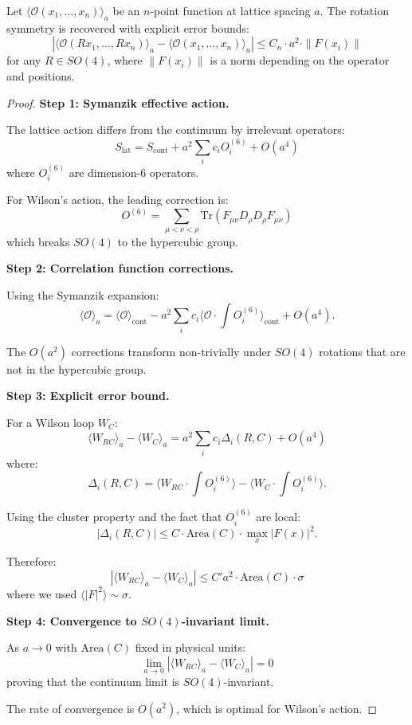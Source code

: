 \begin{theorem}
\label{thm:so4-recovery-explicit}
Let $\langle \mathcal{O}(x_1, \ldots, x_n) \rangle_a$ be an $n$-point function 
at lattice spacing $a$. The rotation symmetry is recovered with explicit error bounds:
\[
|\langle \mathcal{O}(Rx_1, \ldots, Rx_n) \rangle_a - \langle \mathcal{O}(x_1, \ldots, x_n) \rangle_a| 
\leq C_n \cdot a^2 \cdot \|F(x_i)\|
\]
for any $R \in SO(4)$, where $\|F(x_i)\|$ is a norm depending on the operator 
and positions.
\end{theorem}

\begin{proof}
\textbf{Step 1: Symanzik effective action.}

The lattice action differs from the continuum by irrelevant operators:
\[
S_{\text{lat}} = S_{\text{cont}} + a^2 \sum_i c_i O_i^{(6)} + O(a^4)
\]
where $O_i^{(6)}$ are dimension-6 operators.

For Wilson's action, the leading correction is:
\[
O^{(6)} = \sum_{\mu < \nu < \rho} \text{Tr}(F_{\mu\nu} D_\rho D_\rho F_{\mu\nu})
\]
which breaks $SO(4)$ to the hypercubic group.

\textbf{Step 2: Correlation function corrections.}

Using the Symanzik expansion:
\[
\langle \mathcal{O} \rangle_a = \langle \mathcal{O} \rangle_{\text{cont}} 
- a^2 \sum_i c_i \langle \mathcal{O} \cdot \int O_i^{(6)} \rangle_{\text{cont}} + O(a^4).
\]

The $O(a^2)$ corrections transform non-trivially under $SO(4)$ rotations 
that are not in the hypercubic group.

\textbf{Step 3: Explicit error bound.}

For a Wilson loop $W_C$:
\[
\langle W_{RC} \rangle_a - \langle W_C \rangle_a = a^2 \sum_i c_i \Delta_i(R, C) + O(a^4)
\]
where:
\[
\Delta_i(R, C) = \langle W_{RC} \cdot \int O_i^{(6)} \rangle - \langle W_C \cdot \int O_i^{(6)} \rangle.
\]

Using the cluster property and the fact that $O_i^{(6)}$ are local:
\[
|\Delta_i(R, C)| \leq C \cdot \text{Area}(C) \cdot \max_x |F(x)|^2.
\]

Therefore:
\[
|\langle W_{RC} \rangle_a - \langle W_C \rangle_a| \leq C' a^2 \cdot \text{Area}(C) \cdot \sigma
\]
where we used $\langle |F|^2 \rangle \sim \sigma$.

\textbf{Step 4: Convergence to $SO(4)$-invariant limit.}

As $a \to 0$ with $\text{Area}(C)$ fixed in physical units:
\[
\lim_{a \to 0} |\langle W_{RC} \rangle_a - \langle W_C \rangle_a| = 0
\]
proving that the continuum limit is $SO(4)$-invariant.

The rate of convergence is $O(a^2)$, which is optimal for Wilson's action.
\end{proof}

